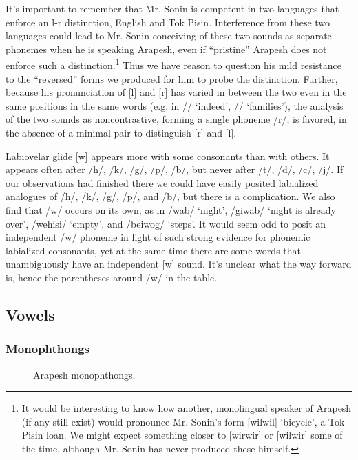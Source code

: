\documentclass[pdftex,12pt,letterpaper]{article}
\let\ipa\textipa
\def\sw{\ipa{\super w}}
\begin{document}
 It's important to remember that Mr. Sonin is competent in two languages that enforce an l-r distinction, English and Tok Pisin. Interference from these two languages could lead to Mr. Sonin conceiving of these two sounds as separate phonemes when he is speaking Arapesh, even if ``pristine'' Arapesh does not enforce such a distinction.\footnote{It would be interesting to know how another, monolingual speaker of Arapesh (if any still exist) would pronounce Mr. Sonin's form [wilwil] `bicycle', a Tok Pisin loan. We might expect something closer to [wirwir] or [wilwir] some of the time, although Mr. Sonin has never produced these himself.} Thus we have reason to question his mild resistance to the ``reversed'' forms we produced for him to probe the distinction. Further, because his pronunciation of {[l]} and {[r]} has varied in between the two even in the same positions in the same words (e.g. in /\ipa{@d1r}/ `indeed', /\ipa{n1r1g@s}/ `families'), the analysis of the two sounds as noncontrastive, forming a single phoneme /r/, is favored, in the absence of a minimal pair to distinguish {[r]} and {[l]}.

 Labiovelar glide [w] appears more with some consonants than with others. It appears often after /h/, /k/, /g/, /p/, /b/, but never after /t/, /d/, /c/, /j/. If our observations had finished there we could have easily posited labialized analogues of /h/, /k/, /g/, /p/, and /b/, but there is a complication. We also find that /w/ occurs on its own, as in /wab/ `night', /giwab/ `night is already over', /wehisi/ `empty', and /beiwog\sw/ `steps'. It would seem odd to posit an independent /w/ phoneme in light of such strong evidence for phonemic labialized consonants, yet at the same time there are some words that unambiguously have an independent [w] sound. It's unclear what the way forward is, hence the parentheses around /w/ in the table.
  
 \subsection{Vowels}

 \subsubsection{Monophthongs}

 \begin{wrapfigure}{r}{.4\textwidth}
 \begin{center}
 {\large
 \begin{vowel}
   \putvowel{\ipa{1}}{63pt}{20pt}
   \putcvowel{\ipa{@}}{11}
   \putcvowel{\ipa{5}}{15}
 \end{vowel}
 }
 \caption{Arapesh monophthongs.}
 \end{center}
 \end{wrapfigure}
\end{document}

